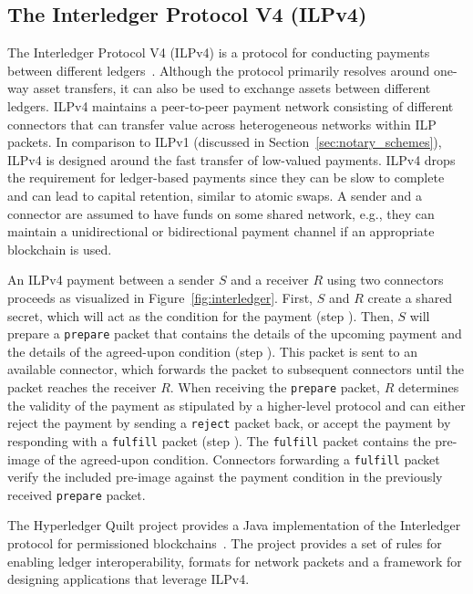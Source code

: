 \subsection{The Interledger Protocol V4 (ILPv4)}
The Interledger Protocol V4 (ILPv4) is a protocol for conducting payments between different ledgers~\cite{ilpv4}.
Although the protocol primarily resolves around one-way asset transfers, it can also be used to exchange assets between different ledgers.
ILPv4 maintains a peer-to-peer payment network consisting of different connectors that can transfer value across heterogeneous networks within ILP packets.
In comparison to ILPv1 (discussed in Section~\ref{sec:notary_schemes}), ILPv4 is designed around the fast transfer of low-valued payments.
ILPv4 drops the requirement for ledger-based payments since they can be slow to complete and can lead to capital retention, similar to atomic swaps.
A sender and a connector are assumed to have funds on some shared network, e.g., they can maintain a unidirectional or bidirectional payment channel if an appropriate blockchain is used.

An ILPv4 payment between a sender $ S $ and a receiver $ R $ using two connectors proceeds as visualized in Figure~\ref{fig:interledger}.
First, $ S $ and $ R $ create a shared secret, which will act as the condition for the payment (step ).
Then, $ S $ will prepare a \texttt{prepare} packet that contains the details of the upcoming payment and the details of the agreed-upon condition (step ).
This packet is sent to an available connector, which forwards the packet to subsequent connectors until the packet reaches the receiver $ R $.
When receiving the \texttt{prepare} packet, $ R $ determines the validity of the payment as stipulated by a higher-level protocol and can either reject the payment by sending a \texttt{reject} packet back, or accept the payment by responding with a \texttt{fulfill} packet (step ).
The \texttt{fulfill} packet contains the pre-image of the agreed-upon condition.
Connectors forwarding a \texttt{fulfill} packet verify the included pre-image against the payment condition in the previously received \texttt{prepare} packet.

The Hyperledger Quilt project provides a Java implementation of the Interledger protocol for permissioned blockchains~\cite{hyperledgerquilt}.
The project provides a set of rules for enabling ledger interoperability, formats for network packets and a framework for designing applications that leverage ILPv4.

